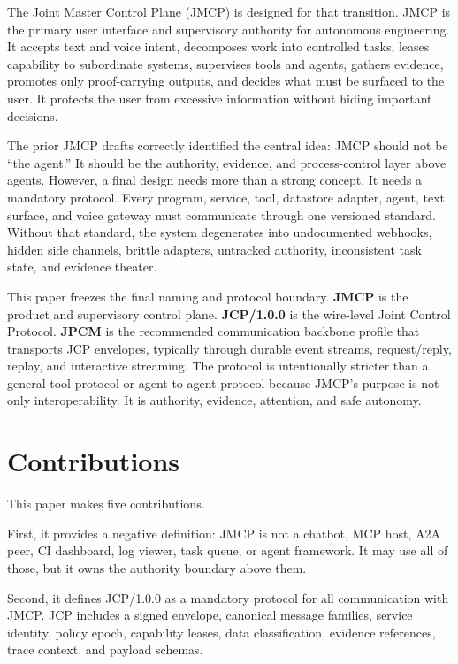 \documentclass[12pt,journal,onecolumn,draftclsnofoot]{IEEEtran}
\begin{document}
The Joint Master Control Plane (JMCP) is designed for that transition. JMCP is the primary user interface and supervisory authority for autonomous engineering. It accepts text and voice intent, decomposes work into controlled tasks, leases capability to subordinate systems, supervises tools and agents, gathers evidence, promotes only proof-carrying outputs, and decides what must be surfaced to the user. It protects the user from excessive information without hiding important decisions.

The prior JMCP drafts correctly identified the central idea: JMCP should not be ``the agent.'' It should be the authority, evidence, and process-control layer above agents. However, a final design needs more than a strong concept. It needs a mandatory protocol. Every program, service, tool, datastore adapter, agent, text surface, and voice gateway must communicate through one versioned standard. Without that standard, the system degenerates into undocumented webhooks, hidden side channels, brittle adapters, untracked authority, inconsistent task state, and evidence theater.

This paper freezes the final naming and protocol boundary. \textbf{JMCP} is the product and supervisory control plane. \textbf{JCP/1.0.0} is the wire-level Joint Control Protocol. \textbf{JPCM} is the recommended communication backbone profile that transports JCP envelopes, typically through durable event streams, request/reply, replay, and interactive streaming. The protocol is intentionally stricter than a general tool protocol or agent-to-agent protocol because JMCP's purpose is not only interoperability. It is authority, evidence, attention, and safe autonomy.

\section{Contributions}
This paper makes five contributions.

First, it provides a negative definition: JMCP is not a chatbot, MCP host, A2A peer, CI dashboard, log viewer, task queue, or agent framework. It may use all of those, but it owns the authority boundary above them.

Second, it defines JCP/1.0.0 as a mandatory protocol for all communication with JMCP. JCP includes a signed envelope, canonical message families, service identity, policy epoch, capability leases, data classification, evidence references, trace context, and payload schemas.
\end{document}
